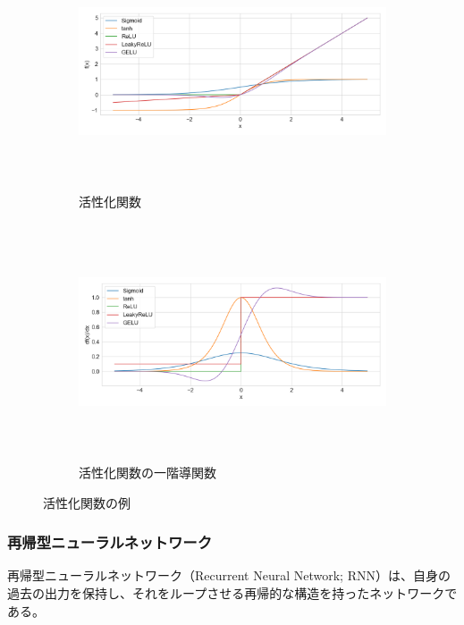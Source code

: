 \documentclass[12pt]{jarticle}
\numberwithin{equation}{section}    %
\numberwithin{figure}{section}      %
\numberwithin{table}{section}      %
\begin{document}
\begin{figure}[tb]
    \centering
    \begin{subfigure}[b]{1.0\textwidth}
        \centering
        \includegraphics[height=7cm]{./figure/sec3/activations.png}
        \caption{活性化関数}
        \label{sec3:fig:activations}
    \end{subfigure}
    \begin{subfigure}[b]{1.0\textwidth}
        \centering
        \includegraphics[height=7cm]{./figure/sec3/activations_prime.png}
        \caption{活性化関数の一階導関数}
        \label{sec3:fig:activations_prime}
    \end{subfigure}
    \caption{活性化関数の例}
    \label{sec3:fig:activations_and_their_prime}
\end{figure}

\subsubsection{再帰型ニューラルネットワーク}
再帰型ニューラルネットワーク（Recurrent Neural Network; RNN）は、自身の過去の出力を保持し、それをループさせる再帰的な構造を持ったネットワークである。
\end{document}
